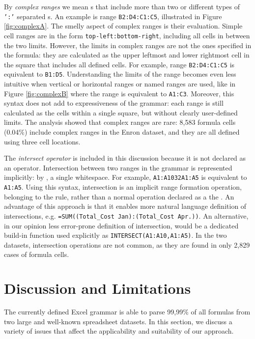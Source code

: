 \documentclass[conference]{IEEEtran}
\begin{document}
By \textit{complex ranges} we mean s that include more than two or different types of \texttt{':'} separated s. An example is range \texttt{B2:D4:C1:C5}, illustrated in Figure \ref{fig:complexA}. The smelly aspect of complex ranges is their evaluation. Simple cell ranges are in the form \texttt{top-left:bottom-right}, including all cells in between the two limits. However, the limits in complex ranges are not the ones specified in the formula: they are calculated as the upper leftmost and lower rightmost cell in the square that includes all defined cells. For example, range \texttt{B2:D4:C1:C5} is equivalent to \texttt{B1:D5}. Understanding the limits of the range becomes even less intuitive when vertical or horizontal ranges or named ranges are used, like in Figure \ref{fig:complexB} where the range is equivalent to \texttt{A1:C3}. Moreover, this syntax does not add to expressiveness of the grammar: each range is still calculated as the cells within a single square, but without clearly user-defined limits. The analysis showed that complex ranges are rare: 8,583 formula cells	(0.04\%) include complex ranges in the Enron dataset, and they are all defined using three cell locations. 

The \textit{intersect operator} is included in this discussion because it is not declared as an operator. Intersection between two ranges in the grammar is represented implicitly: by \texttt{}, a single whitespace. For example, \texttt{A1:A10\char32A1:A5} is equivalent to \texttt{A1:A5}. Using this syntax, intersection is an implicit range formation operation, belonging to the  rule, rather than a normal operation declared as a the . An advantage of this approach is that it enables more natural language definition of intersections, e.g. \texttt{=SUM((Total_Cost Jan):(Total_Cost Apr.))}. An alternative, in our opinion less error-prone definition of intersection, would be a dedicated build-in function used explicitly as \texttt{INTERSECT(A1:A10,A1:A5)}. In the two datasets, intersection operations are not common, as they are found in only 2,829 cases of formula cells.

\section{Discussion and Limitations}
\label{sec:discussion}
The currently defined Excel grammar is able to parse 99,99\% of all formulas from two large and well-known spreadsheet datasets. In this section, we discuss a variety of issues that affect the applicability and suitability of our approach.
\end{document}

